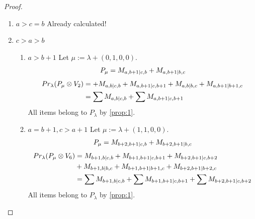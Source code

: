 \begin{proof}
\begin{enumerate}
\begin{enumerate}
  \end{enumerate}

\item $a>c=b$ Already calculated!
\item $c>a>b$
  \begin{enumerate}
    \item $a>b+1$
        Let $\mu:=\lambda + (0,1,0,0) $. 
\begin{equation}\notag
  \begin{aligned}
      P_{\mu} =
M_{a,b+1|c,b}
+M_{a,b+1|b,c}
  \end{aligned}
\end{equation}
\begin{equation}\notag
  \begin{aligned}
    Pr_{\lambda}(P_\mu \otimes V_2) &=
+M_{a,b|c,b}
+M_{a,b+1|c,b+1}
+M_{a,b|b,c}
+M_{a,b+1|b+1,c} \\
                                    &=
\sum M_{a,b|c,b}
+\sum M_{a,b+1|c,b+1}
  \end{aligned}
\end{equation}
All items belong to $P_\lambda$ by \cref{prop:1}.

    \item $a=b+1, c>a+1$
        Let $\mu:=\lambda + (1,1,0,0) $. 
\begin{equation}\notag
  \begin{aligned}
      P_{\mu} =
M_{b+2,b+1|c,b}
+M_{b+2,b+1|b,c}
  \end{aligned}
\end{equation}
\begin{equation}\notag
  \begin{aligned}
    Pr_{\lambda}(P_\mu \otimes V_6) &=
M_{b+1,b|c,b}
+M_{b+1,b+1|c,b+1}
+M_{b+2,b+1|c,b+2} \\
                                    &+
M_{b+1,b|b,c}
+M_{b+1,b+1|b+1,c}
+M_{b+2,b+1|b+2,c}\\
                                    &=
\sum M_{b+1,b|c,b}
+\sum M_{b+1,b+1|c,b+1}
+\sum M_{b+2,b+1|c,b+2}
  \end{aligned}
\end{equation}
All items belong to $P_\lambda$ by \cref{prop:1}.


\end{enumerate}
\end{enumerate}
\end{proof}
